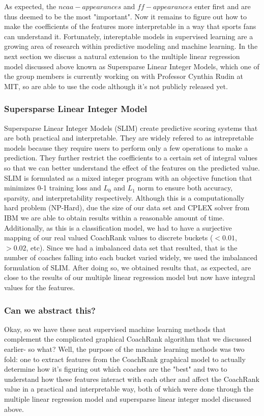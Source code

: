 \documentclass[titlepage,11pt]{article}
\begin{document}
\noindent As expected, the $ncaa-appearances$ and $ff-appearances$ enter first and are thus deemed to be the most "important". Now it remains to figure out how to make the coefficients of the features more interpretable in a way that sports fans can understand it. Fortunately, intereptable models in supervised learning are a growing area of research within predictive modeling and machine learning. In the next section we discuss a natural extension to the multiple linear regression model discussed above known as Supersparse Linear Integer Models, which one of the group members is currently working on with Professor Cynthia Rudin at MIT, so are able to use the code although it's not publicly released yet.

\subsubsection*{Supersparse Linear Integer Model}

Supersparse Linear Integer Models (SLIM) create predictive scoring systems that are both practical and interpretable. They are widely refered to as intrepretable models because they require users to perform only a few operations to make a prediction. They further restrict the coefficients to a certain set of integral values so that we can better understand the effect of the features on the predicted value. SLIM is formulated as a mixed integer program with an objective function that minimizes 0-1 training loss and $L_0$ and $L_1$ norm to ensure both accuracy, sparsity, and interpretability respectively. Although this is a computationally hard problem (NP-Hard), due the size of our data set and CPLEX solver from IBM we are able to obtain results within a reasonable amount of time. Additionally, as this is a classification model, we had to have a surjective mapping of our real valued CoachRank values to discrete buckets ($<0.01$, $>0.02$, etc). Since we had a imbalanced data set that resulted, that is the number of coaches falling into each bucket varied widely, we used the imbalanced formulation of SLIM. After doing so, we obtained results that, as expected, are close to the results of our multiple linear regression model but now have integral values for the features.        

\subsubsection*{Can we abstract this?}

\noindent Okay, so we have these neat supervised machine learning methods that complement the complicated graphical CoachRank algorithm that we discussed earlier- so what? Well, the purpose of the machine learning methods was two fold: one to extract features from the CoachRank graphical model to actually determine how it's figuring out which coaches are the "best" and two to understand how these features interact with each other and affect the CoachRank value in a practical and interpretable way, both of which were done through the multiple linear regression model and supersparse linear integer model discussed above.  
\end{document}
